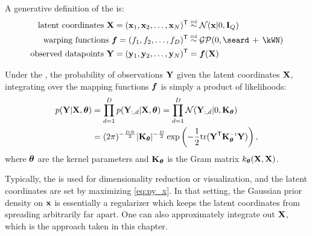 A generative definition of the \gplvm{} is:
%
\begin{align}
\textnormal{latent coordinates } \vX = (\vx_1, \vx_2, \ldots, \vx_{N})\tra & \simiid \N{\vx}{0}{\vI_Q} \\
\textnormal{warping functions } \vf = (f_1, f_2, \ldots, f_D)\tra & \simiid \GPt{0}{\seard \kernplus \kWN} \\
\textnormal{observed datapoints } \vY = (\vy_1, \vy_2, \ldots, \vy_N)\tra & = \vf(\vX)
\end{align}

Under the \gplvm{}, the probability of observations $\mathbf{Y}$ given the latent coordinates $\mathbf{X}$, integrating over the mapping functions $\boldsymbol{f}$ is simply a product of \gp{} likelihoods:
\begin{align}
p(\vY | \vX, \vtheta) 
& = \prod_{d=1}^D p(\vY_{:,d} | \vX, \vtheta) 
  = \prod_{d=1}^D \N{\vY_{:,d}}{0}{\vK_\vtheta} \\ 
& = (2 \pi)^{-\frac{DN}{2}}  |\vK_\vtheta|^{-\frac{D}{2}} \exp \left( -\frac{1}{2} {\rm tr}( \vY\tra \vK_\vtheta\inv \vY) \right),
\label{eq:py_x}
\end{align}
%
where ${\boldsymbol{\theta}}$ are the kernel parameters and $\mathbf{K}_{\boldsymbol{\theta}}$ is the Gram matrix $k_{\boldsymbol{\theta}}(\mathbf{X}, \mathbf{X})$.

Typically, the \gplvm{} is used for dimensionality reduction or visualization, and the latent coordinates are set by maximizing \eqref{eq:py_x}.
In that setting, the Gaussian prior density on ${\bf{x}}$ is essentially a regularizer which keeps the latent coordinates from spreading arbitrarily far apart.  
One can also approximately integrate out $\mathbf{X}$, which is the approach taken in this chapter.





